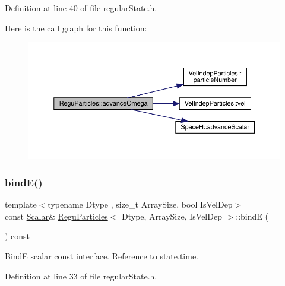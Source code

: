 Definition at line 40 of file regular\+State.\+h.

Here is the call graph for this function\+:\nopagebreak
\begin{figure}[H]
\begin{center}
\leavevmode
\includegraphics[width=350pt]{class_regu_particles_a441b0c766baaa1c8861ac778b5702dc7_cgraph}
\end{center}
\end{figure}
\mbox{\label{class_regu_particles_a26a53ea58c9e25c565021b0b1dbde0e7}} 
\subsubsection{\texorpdfstring{bind\+E()}{bindE()}}
{\footnotesize\ttfamily template$<$typename Dtype , size\+\_\+t Array\+Size, bool Is\+Vel\+Dep$>$ \\
const \mbox{\hyperlink{class_vel_indep_particles_a5d275b22f0d759f360ddd80e78f4b466}{Scalar}}\& \mbox{\hyperlink{class_regu_particles}{Regu\+Particles}}$<$ Dtype, Array\+Size, Is\+Vel\+Dep $>$\+::bindE (\begin{DoxyParamCaption}{ }\end{DoxyParamCaption}) const\hspace{0.3cm}{\ttfamily [inline]}}



BindE scalar const interface. Reference to state.\+time. 



Definition at line 33 of file regular\+State.\+h.

\mbox{\label{class_regu_particles_aee55f0e2663334407455761a49abd087}} 
